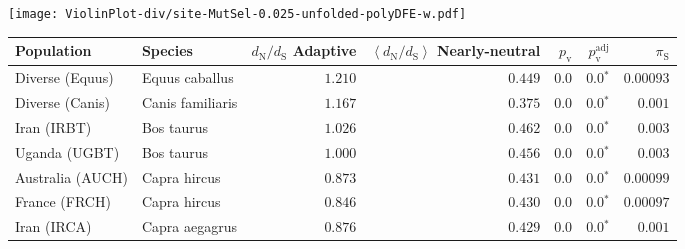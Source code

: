 \begin{center}
\begin{adjustbox}{width = 1\textwidth}
\begin{tabular}{|l|l|r|r|r|r|r|r|r|}
\bottomrule
\end{tabular}
\end{adjustbox}
\newpage
\texttt{[image: ViolinPlot-div/site-MutSel-0.025-unfolded-polyDFE-w.pdf]} 
\begin{adjustbox}{width = 1\textwidth}
\begin{tabular}{|l|l|r|r|r|r|r|}
\toprule
                     Population &              Species & \specialcell{$d_{\mathrm{N}} / d_{\mathrm{S}}$ \\ Adaptive} & \specialcell{$\left< d_{\mathrm{N}} / d_{\mathrm{S}} \right>$ \\ Nearly-neutral} & $p_{\mathrm{v}}$ & $p_{\mathrm{v}}^{\mathrm{adj}}$ & $\pi_{\textrm{S}}$ \\
\midrule
                Diverse (Equus) &       Equus caballus &                                           $ 1.210$ &                                           $ 0.449$ &            $0.0$ &                  $\bm{0.0{^*}}$ &          $0.00093$ \\
                Diverse (Canis) &     Canis familiaris &                                           $ 1.167$ &                                           $ 0.375$ &            $0.0$ &                  $\bm{0.0{^*}}$ &           $ 0.001$ \\
                    Iran (IRBT) &           Bos taurus &                                           $ 1.026$ &                                           $ 0.462$ &            $0.0$ &                  $\bm{0.0{^*}}$ &           $ 0.003$ \\
                  Uganda (UGBT) &           Bos taurus &                                           $ 1.000$ &                                           $ 0.456$ &            $0.0$ &                  $\bm{0.0{^*}}$ &           $ 0.003$ \\
               Australia (AUCH) &         Capra hircus &                                           $ 0.873$ &                                           $ 0.431$ &            $0.0$ &                  $\bm{0.0{^*}}$ &          $0.00099$ \\
                  France (FRCH) &         Capra hircus &                                           $ 0.846$ &                                           $ 0.430$ &            $0.0$ &                  $\bm{0.0{^*}}$ &          $0.00097$ \\
                    Iran (IRCA) &       Capra aegagrus &                                           $ 0.876$ &                                           $ 0.429$ &            $0.0$ &                  $\bm{0.0{^*}}$ &           $ 0.001$ \\

\end{tabular}
\end{adjustbox}
\end{center}
